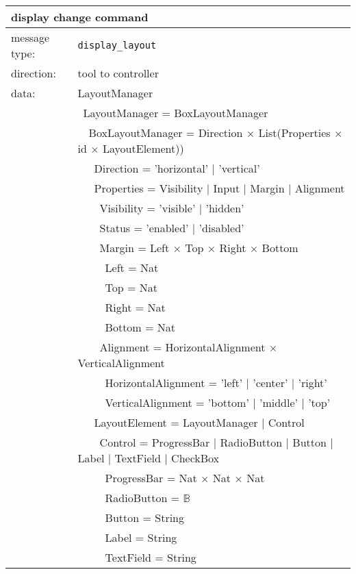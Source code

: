 \documentclass{article}
\newcommand{\msg}[1]{\texttt{#1}}
\begin{document}
   \begin{table}[H]
    \begin{center}
     \begin{tabular}{|ll|}
      \hline
       \multicolumn{2}{|l|}{\textbf{display change command}} \\
      \hline
       message type:   & \msg{display\_layout} \\
      \hline
       direction:      & tool to controller \\
       data:           & LayoutManager \\
                       & \ LayoutManager = BoxLayoutManager \\
                       & \ \ BoxLayoutManager = Direction $\times$ List(Properties $\times$ id $\times$ LayoutElement)) \\
                       & \ \ \ Direction = 'horizontal' $|$ 'vertical' \\
                       & \ \ \ Properties = Visibility $|$ Input $|$ Margin $|$ Alignment \\
                       & \ \ \ \ Visibility = 'visible' $|$ 'hidden' \\
                       & \ \ \ \ Status = 'enabled' $|$ 'disabled' \\
                       & \ \ \ \ Margin = Left $\times$ Top $\times$ Right $\times$ Bottom \\
                       & \ \ \ \ \ Left   = Nat \\
                       & \ \ \ \ \ Top    = Nat \\
                       & \ \ \ \ \ Right  = Nat \\
                       & \ \ \ \ \ Bottom = Nat \\
                       & \ \ \ \ Alignment = HorizontalAlignment $\times$ VerticalAlignment \\
                       & \ \ \ \ \ HorizontalAlignment = 'left' $|$ 'center' $|$ 'right' \\
                       & \ \ \ \ \ VerticalAlignment = 'bottom' $|$ 'middle' $|$ 'top' \\
                       & \ \ \ LayoutElement = LayoutManager $|$ Control \\
                       & \ \ \ \ Control = ProgressBar $|$ RadioButton $|$ Button $|$ Label $|$ TextField $|$ CheckBox \\
                       & \ \ \ \ \ ProgressBar = Nat $\times$ Nat $\times$ Nat \\
                       & \ \ \ \ \ RadioButton = $\mathbb{B}$ \\
                       & \ \ \ \ \ Button      = String \\
                       & \ \ \ \ \ Label       = String \\
                       & \ \ \ \ \ TextField   = String \\
      \hline
     \end{tabular}
    \end{center}
   \end{table}
\end{document}
